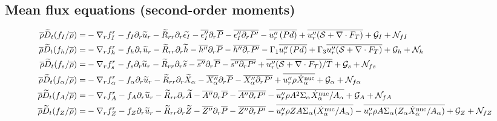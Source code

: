 \documentclass[10pt,paper=a4]{report}
\newcommand{\eht}{\overline}
\newcommand{\fht}{\widetilde}
\newcommand{\fav}{\widetilde}
\def\erho{\eht{\rho}}
\begin{document}
\newpage

\subsection{Mean flux equations (second-order moments)}

\begin{table}[!h]
\begin{align}
\erho \fav{D}_t (f_I / \eht{\rho}) = &  -\nabla_r f_I^r  - f_I \partial_r \fht{u}_r  - \fht{R}_{rr} \partial_r \fht{\epsilon_I} - \eht{\epsilon''_I} \partial_r \eht{P} - \eht{\epsilon''_I \partial_r P'}  - \eht{u''_r \left( P d \right)}  + \overline{u''_r ({\mathcal S} + \nabla \cdot F_T)} + {\mathcal G_I} +  {\mathcal N_{fI}} \label{eq:rans_fi} \\
\erho \fav{D}_t (f_h / \eht{\rho}) = &  -\nabla_r f_h^r - f_h \partial_r \fht{u}_r - \fht{R}_{rr} \partial_r \fht{h} -\eht{h''}\partial_r \eht{P} - \eht{h''\partial_r P'} - \Gamma_1\eht{u''_r \left( P d \right) } + \Gamma_3 \overline{u''_r ({\mathcal S} + \nabla \cdot F_T)} + {\mathcal G_h} + {\mathcal N_{h \ }} \label{eq:rans_fh} \\
\erho \fav{D}_t (f_s / \eht{\rho}) = & -\nabla_r f_s^r - f_s \partial_r \fht{u}_r - \fht{R}_{rr} \partial_r \fht{s} -\eht{s''}\partial_r \eht{P} - \eht{s''\partial_r P'} + \eht{u''_r ( {\mathcal S} + \nabla \cdot F_T)  / T} + {\mathcal G_s} + {\mathcal N_{fs}}  \label{eq:rans_fs} \\
\erho \fav{D}_t (f_\alpha / \eht{\rho}) = &  -\nabla_r f_\alpha^r  - f_\alpha \partial_r \fht{u}_r - \fht{R}_{rr} \partial_r \fht{X}_\alpha -\eht{X''_\alpha} \partial_r \eht{P} - \eht{X''_\alpha \partial_r P'} + \overline{u''_r \rho \dot{X}_\alpha^{\rm nuc}} + {\mathcal G_\alpha} + {\mathcal N_{f\alpha}}  \label{eq:rans_falpha} \\
\erho \fav{D}_t (f_A / \eht{\rho}) = &  -\nabla_r f_A^r - f_A \partial_r \fht{u}_r - \fht{R}_{rr} \partial_r \fht{A} -\eht{A''} \partial_r \eht{P} - \eht{A'' \partial_r P'} - \overline{u''_r \rho A^2\Sigma_\alpha \dot{X}_\alpha^{\rm nuc} / A_\alpha} + {\mathcal G_A} + {\mathcal N_{fA}}                \label{eq:rans_fabar} \\
\erho \fav{D}_t (f_Z / \eht{\rho}) = &  -\nabla_r f_Z^r  - f_Z \partial_r \fht{u}_r - \fht{R}_{rr} \partial_r \fht{Z} -\eht{Z''} \partial_r \eht{P} - \eht{Z'' \partial_r P'} - \overline{u''_r \rho Z A \Sigma_\alpha (\dot{X}_\alpha^{\rm nuc}/ A_\alpha)} - \overline{u''_r \rho A \Sigma_\alpha (Z_\alpha \dot{X}_\alpha^{\rm nuc} / A_\alpha)}  + {\mathcal G_Z} + {\mathcal N_{fZ}}   \label{eq:rans_fzbar}  \\

\end{align}
\end{table}
\end{document}
